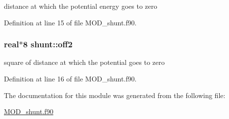 distance at which the potential energy goes to zero 



Definition at line 15 of file M\-O\-D\-\_\-shunt.\-f90.

\hypertarget{classshunt_a1e0abe89467a0036f7b740bb6db645b6}{
\subsubsection[{off2}]{\setlength{\rightskip}{0pt plus 5cm}real$\ast$8 shunt\-::off2}}\label{classshunt_a1e0abe89467a0036f7b740bb6db645b6}


square of distance at which the potential goes to zero 



Definition at line 16 of file M\-O\-D\-\_\-shunt.\-f90.



The documentation for this module was generated from the following file\-:\begin{DoxyCompactItemize}
\item 
\hyperlink{MOD__shunt_8f90}{M\-O\-D\-\_\-shunt.\-f90}\end{DoxyCompactItemize}
